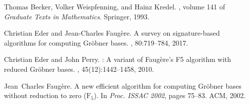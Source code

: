 \documentclass{article}
\begin{document}
\begin{thebibliography}{BWK93}

Thomas Becker, Volker Weispfenning, and Hainz Kredel.
, volume 141 of {\em Graduate Texts in
  Mathematics}.
\newblock Springer, 1993.

Christian Eder and Jean-Charles Faugère.
\newblock A survey on signature-based algorithms for computing {G}röbner
  bases.
, 80:719--784, 2017.

Christian Eder and John Perry.
: A variant of {F}aug{\`{e}}re's {F5} algorithm with reduced
  {G}r{\"o}bner bases.
, 45(12):1442--1458, 2010.

Jean~Charles Faugère.
\newblock A new efficient algorithm for computing {G}röbner bases without
  reduction to zero ($\textrm{{F}}_5$).
\newblock In {\em Proc. ISSAC 2002}, pages 75--83. ACM, 2002.

\end{thebibliography}

% 
% 
\end{document}
